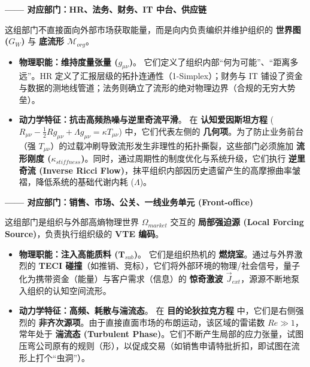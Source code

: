 
\textbf{—— 对应部门：HR、法务、财务、IT 中台、供应链}

这组部门不直接面向外部市场获取能量，而是向内负责编织并维护组织的 \textbf{世界图 ($G_W$)} 与 \textbf{底流形 $\mathcal{M}_{org}$}。

\begin{itemize}
    \item \textbf{物理职能：维持度量张量 ($g_{\mu\nu}$)}。
    它们定义了组织内部“何为可能”、“距离多远”。HR 定义了汇报层级的拓扑连通性（1-Simplex）；财务与 IT 铺设了资金与数据的测地线管道；法务则确立了流形的绝对物理边界（合规的无穷大势垒）。

    \item \textbf{动力学特征：抗击高频热噪与逆里奇流平滑}。
    在 \textbf{认知爱因斯坦方程} ($R_{\mu\nu} - \frac{1}{2}Rg_{\mu\nu} + \Lambda g_{\mu\nu} = \kappa T_{\mu\nu}$) 中，它们代表左侧的 \textbf{几何项}。为了防止业务前台（强 $T_{\mu\nu}$）的过载冲刷导致流形发生非理性的拓扑撕裂，这些部门必须施加 \textbf{流形刚度 ($\kappa_{stiffness}$)}。同时，通过周期性的制度优化与系统升级，它们执行 \textbf{逆里奇流 (Inverse Ricci Flow)}，抹平组织内部因历史遗留产生的高摩擦曲率皱褶，降低系统的基础代谢内耗 ($\Lambda$)。
\end{itemize}


\textbf{—— 对应部门：销售、市场、公关、一线业务单元 (Front-office)}

这组部门是组织与外部高熵物理世界 $\Omega_{market}$ 交互的 \textbf{局部强迫源 (Local Forcing Source)}，负责执行组织级的 \textbf{VTE 编码}。

\begin{itemize}
    \item \textbf{物理职能：注入高能质料 ($\mathbf{T}_{sub}$)}。
    它们是组织热机的 \textbf{燃烧室}。通过与外界激烈的 \textbf{TECI 碰撞}（如推销、竞标），它们将外部环境的物理/社会信号，量子化为携带资金（能量）与客户需求（信息）的 \textbf{惊奇激波 $\vec{J}_{ext}$}，源源不断地泵入组织的认知空间流形。

    \item \textbf{动力学特征：高频、耗散与湍流态}。
    在 \textbf{目的论狄拉克方程} 中，它们是右侧强烈的 \textbf{非齐次源项}。由于直接直面市场的布朗运动，该区域的雷诺数 $Re \gg 1$，常年处于 \textbf{湍流态 (Turbulent Phase)}。它们不断产生局部的应力张量，试图压弯公司原有的规则（形），以促成交易（如销售申请特批折扣，即试图在流形上打个“虫洞”）。
\end{itemize}

